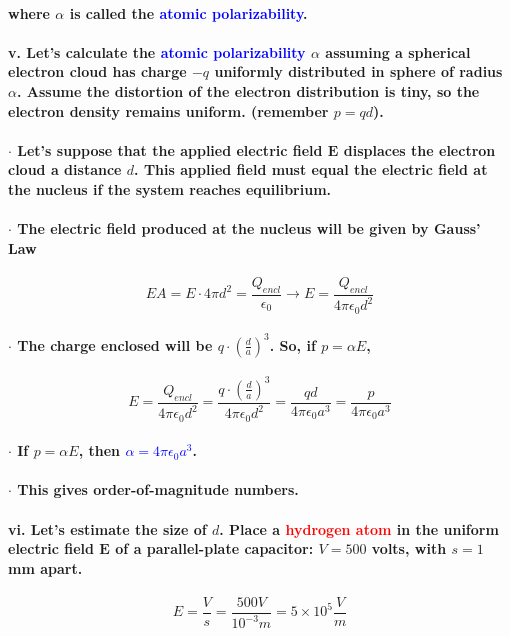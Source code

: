 \documentclass{article}
\begin{document}
\paragraph{where $\alpha$ is called the \textcolor{blue}{atomic polarizability}.}
\paragraph{\indent v. Let's calculate the \textcolor{blue}{atomic polarizability} $\alpha$ assuming a spherical electron cloud has charge $-q$ uniformly distributed in sphere of radius $\alpha$. Assume the distortion of the electron distribution is tiny, so the electron density remains uniform. (remember $p=qd$).}
\paragraph{\indent $\cdot$ Let's suppose that the applied electric field $\boldsymbol{E}$ displaces the electron cloud a distance $d$. This applied field must equal the electric field at the nucleus if the system reaches equilibrium.}
\paragraph{\indent $\cdot$ The electric field produced at the nucleus will be given by Gauss' Law}
\begin{equation*}
    EA=E\cdot 4\pi d^2=\frac{Q_{encl}}{\epsilon_0}\rightarrow E=\frac{Q_{encl}}{4\pi\epsilon_0d^2}
\end{equation*}
\paragraph{\indent $\cdot$ The charge enclosed will be $q\cdot (\frac{d}{a})^3$. So, if $p=\alpha E$,}
\begin{equation*}
    E=\frac{Q_{encl}}{4\pi\epsilon_0d^2}=\frac{q\cdot(\frac{d}{a})^3}{4\pi\epsilon_0d^2}=\frac{qd}{4\pi\epsilon_0a^3}=\frac{p}{4\pi\epsilon_0a^3}
\end{equation*}
\paragraph{\indent $\cdot$ If $p=\alpha E$, then \textcolor{blue}{$\alpha =4\pi\epsilon_0a^3$}.}
\paragraph{\indent $\cdot$ This gives order-of-magnitude numbers.}
\paragraph{\indent vi. Let's estimate the size of $d$. Place a \textcolor{red}{hydrogen atom} in the uniform electric field $\boldsymbol{E}$ of a parallel-plate capacitor: $V=500$ volts, with $s=1$ mm apart.}
\begin{equation*}
    E=\frac{V}{s}=\frac{500 V}{10^{-3}m}=5\times 10^5\frac{V}{m}
\end{equation*}
\end{document}
